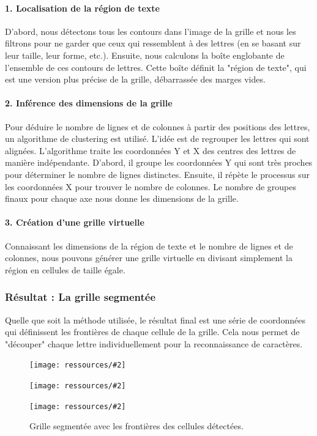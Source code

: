 \documentclass{article}
\newcommand{\stepimage}[3][0.3\textwidth]{%
  \minipage{#1}
    \texttt{[image: ressources/\#2]}
    \caption{#3}
  \endminipage\hfill
}
\begin{document}
\paragraph{1. Localisation de la région de texte}
D'abord, nous détectons tous les contours dans l'image de la grille et nous les filtrons pour ne garder que ceux qui ressemblent à des lettres (en se basant sur leur taille, leur forme, etc.). Ensuite, nous calculons la boîte englobante de l'ensemble de ces contours de lettres. Cette boîte définit la "région de texte", qui est une version plus précise de la grille, débarrassée des marges vides.


\paragraph{2. Inférence des dimensions de la grille}
Pour déduire le nombre de lignes et de colonnes à partir des positions des lettres, un algorithme de clustering est utilisé. L'idée est de regrouper les lettres qui sont alignées. L'algorithme traite les coordonnées Y et X des centres des lettres de manière indépendante. D'abord, il groupe les coordonnées Y qui sont très proches pour déterminer le nombre de lignes distinctes. Ensuite, il répète le processus sur les coordonnées X pour trouver le nombre de colonnes. Le nombre de groupes finaux pour chaque axe nous donne les dimensions de la grille.

\paragraph{3. Création d'une grille virtuelle}
Connaissant les dimensions de la région de texte et le nombre de lignes et de colonnes, nous pouvons générer une grille virtuelle en divisant simplement la région en cellules de taille égale.

\subsubsection{Résultat : La grille segmentée}

Quelle que soit la méthode utilisée, le résultat final est une série de coordonnées qui définissent les frontières de chaque cellule de la grille. Cela nous permet de "découper" chaque lettre individuellement pour la reconnaissance de caractères.

\begin{figure}[H]
    \stepimage[0.30\textwidth]{image_1_step_10_reconstructed_grid.png}{}
    \stepimage[0.30\textwidth]{image_2_step_10_reconstructed_grid.png}{}
    \stepimage[0.26\textwidth]{image_3_step_10_reconstructed_grid.png}{}
    \caption{Grille segmentée avec les frontières des cellules détectées.}
\end{figure}
\newpage
\end{document}
